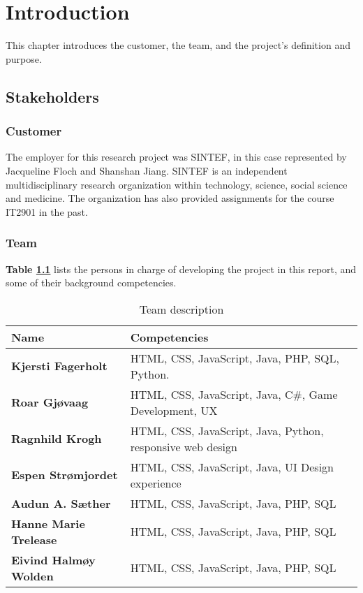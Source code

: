 
\chapter{Introduction}

This chapter introduces the customer, the team, and the project's definition and purpose.

\section{Stakeholders}

\subsection{Customer}

The employer for this research project was SINTEF, in this case represented by Jacqueline Floch and Shanshan Jiang. SINTEF is an independent multidisciplinary research organization within technology, science, social science and medicine. The organization has also provided assignments for the course IT2901 in the past.

\subsection{Team}

\textbf{Table \ref{Tab:team}} lists the persons in charge of developing the project in this report, and some of their background competencies.

\begin{table}[!h]
	\begin{center}
		\caption{Team description}
		\label{Tab:team}
		\begin{tabular}{  l  l }
			\textbf{Name} & \textbf{Competencies} \\ \hline
			\textbf{Kjersti Fagerholt} & HTML, CSS, JavaScript, Java, PHP, SQL, Python. \\ 
			\textbf{Roar Gjøvaag} &  HTML, CSS, JavaScript, Java, C\#, Game Development, UX \\ 
			\textbf{Ragnhild Krogh} & HTML, CSS, JavaScript, Java, Python, responsive web design \\ 
			\textbf{Espen Strømjordet} & HTML, CSS, JavaScript, Java,
			UI Design experience \\ 
			\textbf{Audun A. Sæther} & HTML, CSS, JavaScript, Java, PHP, SQL \\ 
			\textbf{Hanne Marie Trelease} & HTML, CSS, JavaScript, Java, PHP, SQL \\ 
			\textbf{Eivind Halmøy Wolden} & HTML, CSS, JavaScript, Java, PHP, SQL \\ 
		\end{tabular}
	\end{center}
\end{table}

